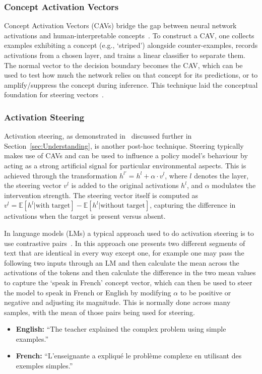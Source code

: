 \subsubsection{Concept Activation Vectors}
Concept Activation Vectors (CAVs) bridge the gap between neural network activations and human-interpretable concepts~\citep{kim_2018_interpretability}. To construct a CAV, one collects examples exhibiting a concept (e.g., `striped') alongside counter-examples, records activations from a chosen layer, and trains a linear classifier to separate them. The normal vector to the decision boundary becomes the CAV, which can be used to test how much the network relies on that concept for its predictions, or to amplify/suppress the concept during inference. This technique laid the conceptual foundation for steering vectors~\citep{turner_2024_steering}.

\subsubsection{Activation Steering}\label{subsubsec:activation_steering}
Activation steering, as demonstrated in~\citep{mini_2023_understanding,turner_2024_activation} discussed further in Section~\ref{sec:Understanding}, is another post-hoc technique. Steering typically makes use of CAVs and can be used to influence a policy model's behaviour by acting as a strong artificial signal for particular environmental aspects. This is achieved through the transformation $h^{l'} = h^l + \alpha \cdot v^l$, where $l$ denotes the layer, the steering vector $v^l$ is added to the original activations $h^l$, and $\alpha$ modulates the intervention strength. The steering vector itself is computed as $v^l = \mathbb{E}[h^l|\text{with target}] - \mathbb{E}[h^l|\text{without target}]$, capturing the difference in activations when the target is present versus absent.

In language models (LMs) a typical approach used to do activation steering is to use contrastive pairs~\citep{turner_2024_activation}. In this approach one presents two different segments of text that are identical in every way except one, for example one may pass the following two inputs through an LM and then calculate the mean across the activations of the tokens and then calculate the difference in the two mean values to capture the `speak in French' concept vector, which can then be used to steer the model to speak in French or English by modifying $\alpha$ to be positive or negative and adjusting its magnitude. This is normally done across many samples, with the mean of those pairs being used for steering. 
\begin{itemize}
    \item \textbf{English:} ``The teacher explained the complex problem using simple examples.''
    
    \item \textbf{French:} ``L'enseignante a expliqué le problème complexe en utilisant des exemples simples.''
\end{itemize}

